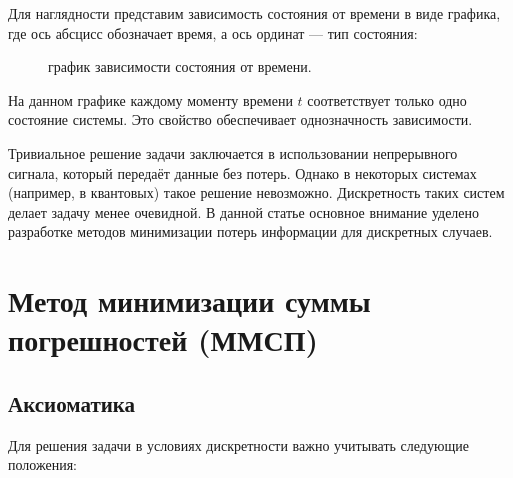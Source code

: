 \documentclass[12pt]{report}
\begin{document}
Для наглядности представим зависимость состояния от времени в виде графика, где ось абсцисс обозначает время, а ось ординат — тип состояния:
\begin{figure}[ht]
    \centering
    \caption{график зависимости состояния от времени.}
    \label{fig:example}
\end{figure}

На данном графике каждому моменту времени $t$ соответствует только одно состояние системы. Это свойство обеспечивает однозначность зависимости.
\label{sec:def}

Тривиальное решение задачи заключается в использовании непрерывного сигнала, который передаёт данные без потерь. Однако в некоторых системах (например, в квантовых) такое решение невозможно. Дискретность таких систем делает задачу менее очевидной. В данной статье основное внимание уделено разработке методов минимизации потерь информации для дискретных случаев.

\section{Метод минимизации суммы погрешностей (ММСП)}
\subsection{Аксиоматика}
Для решения задачи в условиях дискретности важно учитывать следующие положения:
\end{document}
